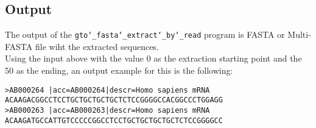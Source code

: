 \subsection*{Output}
The output of the \texttt{gto\char`_fasta\char`_extract\char`_by\char`_read} program is FASTA or Multi-FASTA file wiht the extracted sequences.\\
Using the input above with the value 0 as the extraction starting point and the 50 as the ending, an output example for this is the following:
\begin{lstlisting}
>AB000264 |acc=AB000264|descr=Homo sapiens mRNA 
ACAAGACGGCCTCCTGCTGCTGCTGCTCTCCGGGGCCACGGCCCTGGAGG
>AB000263 |acc=AB000263|descr=Homo sapiens mRNA 
ACAAGATGCCATTGTCCCCCGGCCTCCTGCTGCTGCTGCTCTCCGGGGCC
\end{lstlisting}